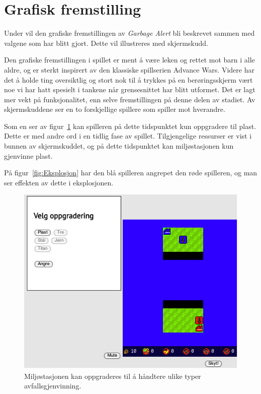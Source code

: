 \section{Grafisk fremstilling}\label{sec:artwork}
Under vil den grafiske fremstillingen av \emph{Garbage Alert} bli beskrevet
sammen med valgene som har blitt gjort. Dette vil illustreres med
skjermskudd.

Den grafiske fremstillingen i spillet er ment å være leken og rettet mot
barn i alle aldre, og er sterkt inspirert av den klassiske spillserien
Advance Wars. Videre har det å holde ting oversiktlig og stort nok til å
trykkes på en berøringsskjerm vært noe vi har hatt spesielt i tankene
når grensesnittet har blitt utformet. Det er lagt mer vekt på
funksjonalitet, enn selve fremstillingen på denne delen av stadiet. Av
skjermskuddene ser en to forskjellige spillere som spiller mot
hverandre.

Som en ser av figur~\ref{fig:Oppgradering} kan spilleren på dette
tidspunktet kun oppgradere til plast. Dette er med andre ord i en tidlig
fase av spillet. Tilgjengelige ressurser er vist i bunnen av
skjermskuddet, og på dette tidspunktet kan miljøstasjonen kun gjenvinne
plast.

På figur~\ref{fig:Eksplosjon} har den blå spilleren angrepet den røde
spilleren, og man ser effekten av dette i eksplosjonen.

\begin{figure} [H]
\centering
\includegraphics[width=\textwidth]{images/Oppgradering.png}
\caption{Miljøstasjonen kan oppgraderes til å håndtere ulike typer avfallsgjenvinning.}
\label{fig:Oppgradering}
\end{figure}

